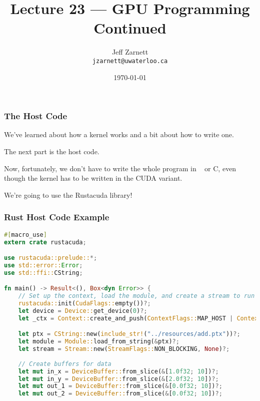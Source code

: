 

\title{Lecture 23 --- GPU Programming Continued }

\author{Jeff Zarnett \\ \small \texttt{jzarnett@uwaterloo.ca}}
\date{\today}




\begin{frame}
  \titlepage

\end{frame}


\begin{frame}
\frametitle{The Host Code}

We've learned about how a kernel works and a bit about how to write one. 

The next part is the host code.

Now, fortunately, we don't have to write the whole program in \CPP~ or C, even though the kernel has to be written in the CUDA variant. 

We're going to use the Rustacuda library!
\end{frame}


\begin{frame}[fragile]
\frametitle{Rust Host Code Example}
\begin{lstlisting}[language=Rust]
#[macro_use]
extern crate rustacuda;

use rustacuda::prelude::*;
use std::error::Error;
use std::ffi::CString;

fn main() -> Result<(), Box<dyn Error>> {
    // Set up the context, load the module, and create a stream to run kernels in.
    rustacuda::init(CudaFlags::empty())?;
    let device = Device::get_device(0)?;
    let _ctx = Context::create_and_push(ContextFlags::MAP_HOST | ContextFlags::SCHED_AUTO, device)?;

    let ptx = CString::new(include_str!("../resources/add.ptx"))?;
    let module = Module::load_from_string(&ptx)?;
    let stream = Stream::new(StreamFlags::NON_BLOCKING, None)?;
    
    // Create buffers for data
    let mut in_x = DeviceBuffer::from_slice(&[1.0f32; 10])?;
    let mut in_y = DeviceBuffer::from_slice(&[2.0f32; 10])?;
    let mut out_1 = DeviceBuffer::from_slice(&[0.0f32; 10])?;
    let mut out_2 = DeviceBuffer::from_slice(&[0.0f32; 10])?;
\end{lstlisting}

\end{frame}


